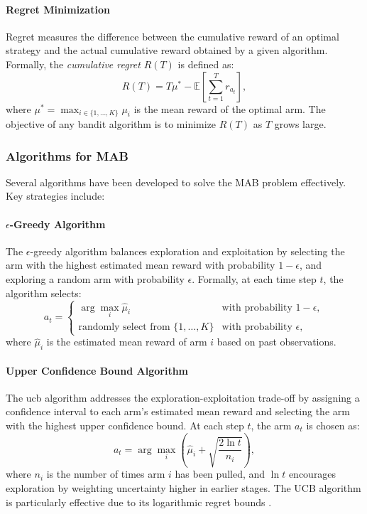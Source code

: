 \paragraph{Regret Minimization}
Regret measures the difference between the cumulative reward of an optimal strategy and the actual cumulative reward obtained by a given algorithm. Formally, the \textit{cumulative regret} $R(T)$ is defined as:
\begin{equation}
    R(T) = T \mu^* - \mathbb{E}\left[\sum_{t=1}^T r_{a_t}\right],
\end{equation}
where $\mu^* = \max_{i \in \{1, \ldots, K\}} \mu_i$ is the mean reward of the optimal arm. The objective of any bandit algorithm is to minimize $R(T)$ as $T$ grows large.

\subsubsection{Algorithms for MAB}
Several algorithms have been developed to solve the MAB problem effectively. Key strategies include:

\paragraph{$\epsilon$-Greedy Algorithm}
The $\epsilon$-greedy algorithm balances exploration and exploitation by selecting the arm with the highest estimated mean reward with probability $1 - \epsilon$, and exploring a random arm with probability $\epsilon$. Formally, at each time step $t$, the algorithm selects:
\begin{equation}
    a_t =
    \begin{cases}
        \arg \max_i \hat{\mu}_i & \text{with probability } 1 - \epsilon, \\
        \text{randomly select from } \{1, \ldots, K\} & \text{with probability } \epsilon,
    \end{cases}
\end{equation}
where $\hat{\mu}_i$ is the estimated mean reward of arm $i$ based on past observations.

\paragraph{Upper Confidence Bound Algorithm}
The \ac{ucb} algorithm addresses the exploration-exploitation trade-off by assigning a confidence interval to each arm’s estimated mean reward and selecting the arm with the highest upper confidence bound. At each step $t$, the arm $a_t$ is chosen as:
\begin{equation}
    a_t = \arg \max_i \left( \hat{\mu}_i + \sqrt{\frac{2 \ln t}{n_i}} \right),
\end{equation}
where $n_i$ is the number of times arm $i$ has been pulled, and $\ln t$ encourages exploration by weighting uncertainty higher in earlier stages. The UCB algorithm is particularly effective due to its logarithmic regret bounds \citep{auer2002finite}.

